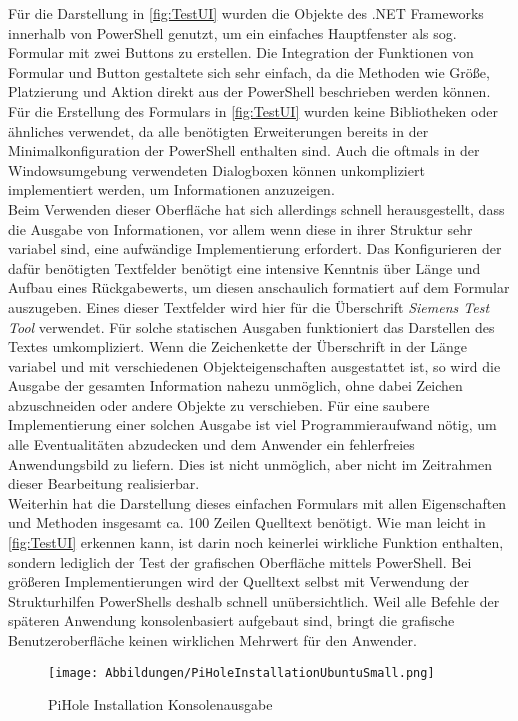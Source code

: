 Für die Darstellung in \autoref{fig:TestUI} wurden die Objekte des .NET Frameworks innerhalb von PowerShell genutzt, um ein einfaches Hauptfenster als sog. Formular mit zwei Buttons zu erstellen. Die Integration der Funktionen von Formular und Button gestaltete sich sehr einfach, da die Methoden wie Größe, Platzierung und Aktion direkt aus der PowerShell beschrieben werden können. Für die Erstellung des Formulars in \autoref{fig:TestUI} wurden keine Bibliotheken oder ähnliches verwendet, da alle benötigten Erweiterungen bereits in der Minimalkonfiguration der PowerShell enthalten sind. Auch die oftmals in der Windowsumgebung verwendeten Dialogboxen können unkompliziert implementiert werden, um Informationen anzuzeigen.\\Beim Verwenden dieser Oberfläche hat sich allerdings schnell herausgestellt, dass die Ausgabe von Informationen, vor allem wenn diese in ihrer Struktur sehr variabel sind, eine aufwändige Implementierung erfordert. Das Konfigurieren der dafür benötigten Textfelder benötigt eine intensive Kenntnis über Länge und Aufbau eines Rückgabewerts, um diesen anschaulich formatiert auf dem Formular auszugeben. Eines dieser Textfelder wird hier für die Überschrift \textit{Siemens Test Tool} verwendet. Für solche statischen Ausgaben funktioniert das Darstellen des Textes umkompliziert. Wenn die Zeichenkette der Überschrift in der Länge variabel und mit verschiedenen Objekteigenschaften ausgestattet ist, so wird die Ausgabe der gesamten Information nahezu unmöglich, ohne dabei Zeichen abzuschneiden oder andere Objekte zu verschieben. Für eine saubere Implementierung einer solchen Ausgabe ist viel Programmieraufwand nötig, um alle Eventualitäten abzudecken und dem Anwender ein fehlerfreies Anwendungsbild zu liefern. Dies ist nicht unmöglich, aber nicht im Zeitrahmen dieser Bearbeitung realisierbar.\medskip\\Weiterhin hat die Darstellung dieses einfachen Formulars mit allen Eigenschaften und Methoden insgesamt ca. 100 Zeilen Quelltext benötigt. Wie man leicht in \autoref{fig:TestUI} erkennen kann, ist darin noch keinerlei wirkliche Funktion enthalten, sondern lediglich der Test der grafischen Oberfläche mittels PowerShell. Bei größeren Implementierungen wird der Quelltext selbst mit Verwendung der Strukturhilfen PowerShells deshalb schnell unübersichtlich. Weil alle Befehle der späteren Anwendung konsolenbasiert aufgebaut sind, bringt die grafische Benutzeroberfläche keinen wirklichen Mehrwert für den Anwender.\newpage 
\begin{wrapfigure}[]{r}{7.7cm}
    \centering
    \texttt{[image: Abbildungen/PiHoleInstallationUbuntuSmall.png]}\caption[PiHole Installation Konsolenausgabe]{PiHole Installation Konsolenausgabe\protect\footnotemark} 
    \label{fig:piHole}
\end{wrapfigure}
